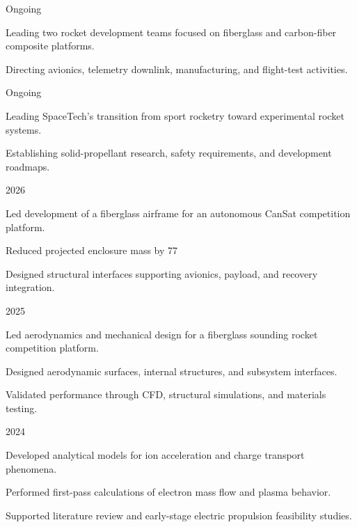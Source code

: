 \cvsection{\ProjectsLabel}

{Ongoing}
{
\begin{cvitems}
\item Leading two rocket development teams focused on fiberglass and carbon-fiber composite platforms.
\item Directing avionics, telemetry downlink, manufacturing, and flight-test activities.
\end{cvitems}
}

{Ongoing}
{
\begin{cvitems}
\item Leading SpaceTech's transition from sport rocketry toward experimental rocket systems.
\item Establishing solid-propellant research, safety requirements, and development roadmaps.
\end{cvitems}
}

{2026}
{
\begin{cvitems}
\item Led development of a fiberglass airframe for an autonomous CanSat competition platform.
\item Reduced projected enclosure mass by 77%
\item Designed structural interfaces supporting avionics, payload, and recovery integration.
\end{cvitems}
}

{2025}
{
\begin{cvitems}
\item Led aerodynamics and mechanical design for a fiberglass sounding rocket competition platform.
\item Designed aerodynamic surfaces, internal structures, and subsystem interfaces.
\item Validated performance through CFD, structural simulations, and materials testing.
\end{cvitems}
}

{2024}
{
\begin{cvitems}
\item Developed analytical models for ion acceleration and charge transport phenomena.
\item Performed first-pass calculations of electron mass flow and plasma behavior.
\item Supported literature review and early-stage electric propulsion feasibility studies.
\end{cvitems}
}
